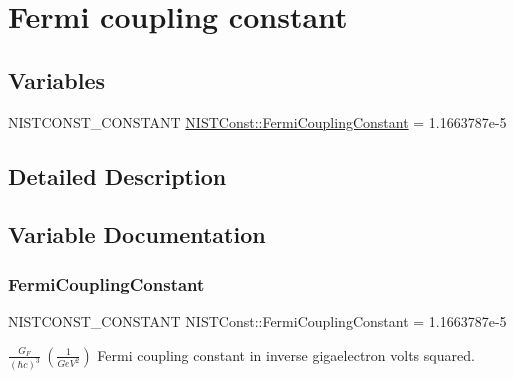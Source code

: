 \hypertarget{group___n_i_s_t_const-_fermi_coupling_constant}{}\section{Fermi coupling constant}
\label{group___n_i_s_t_const-_fermi_coupling_constant}
\subsection*{Variables}
\begin{DoxyCompactItemize}
\item 
N\+I\+S\+T\+C\+O\+N\+S\+T\+\_\+\+C\+O\+N\+S\+T\+A\+NT \mbox{\hyperlink{group___n_i_s_t_const-_fermi_coupling_constant_ga2bf2a03b5ea1bb506508e9c65b24dd52}{N\+I\+S\+T\+Const\+::\+Fermi\+Coupling\+Constant}} = 1.\+1663787e-\/5
\end{DoxyCompactItemize}


\subsection{Detailed Description}


\subsection{Variable Documentation}
\mbox{\label{group___n_i_s_t_const-_fermi_coupling_constant_ga2bf2a03b5ea1bb506508e9c65b24dd52}} 
\subsubsection{\texorpdfstring{Fermi\+Coupling\+Constant}{FermiCouplingConstant}}
{\footnotesize\ttfamily N\+I\+S\+T\+C\+O\+N\+S\+T\+\_\+\+C\+O\+N\+S\+T\+A\+NT N\+I\+S\+T\+Const\+::\+Fermi\+Coupling\+Constant = 1.\+1663787e-\/5}

$\frac{G_F}{(\hbar c)^3} \ (\frac{1}{GeV^2})$ Fermi coupling constant in inverse gigaelectron volts squared. 